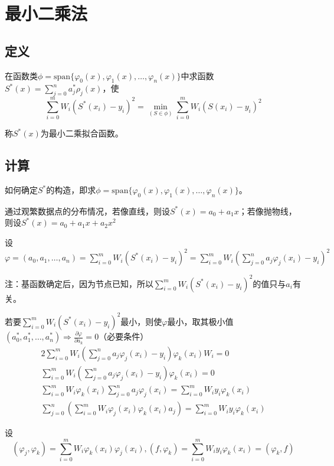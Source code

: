 \documentclass[UTF8,a4paper,11pt,oneside]{ctexbook}
\begin{document}
\chapter{最小二乘法}

\section{定义}

在函数类\(\phi=\mathrm{span}\{\varphi_0(x),\varphi_1(x),\ldots,\varphi_n(x)\}\)中求函数\(S^*(x)=\sum\limits_{j=0}^na_j^*\rho_j(x)\)，使
\[
\sum\limits_{i=0}^mW_i(S^*(x_i)-y_i)^2=\min\limits_{(S\in\phi)}\sum\limits_{i=0}^mW_i(S(x_i)-y_i)^2
\]

称\(S^*(x)\)为最小二乘拟合函数。

\section{计算}

如何确定\(S^*\)的构造，即求\(\phi=\mathrm{span}\{\varphi_0(x),\varphi_1(x),\ldots,\varphi_n(x)\}\)。

通过观繁数据点的分布情况，若像直线，则设\(S^*(x)=a_0+a_1x\)；若像抛物线，则设\(S^*(x)=a_0+a_1x+a_2x^2\)

设\(\varphi=(a_0,a_1,\ldots,a_n)=\sum\limits_{i=0}^{m}W_i(S^*(x_i)-y_i)^2=\sum\limits_{i=0}^mW_i(\sum\limits_{j=0}^na_j\varphi_j(x_i)-y_i)^2\)

注：基函数确定后，因为节点已知，所以\(\sum\limits_{i=0}^mW_i(S^*(x_i)-y_i)^2\)的值只与\(a_i\)有关。

若要\(\sum\limits_{i=0}^mW_i(S^*(x_i)-y_i)^2\)最小，则使\(\varphi\)最小，取其极小值\((a_0^*,a_1^*,\ldots,a_n^*)\Rightarrow\frac{\partial\varphi}{\partial a_k}=0\)（必要条件）
\begin{gather*}
    2\sum_{i=0}^mW_i\left(\sum_{j=0}^na_j\varphi_j(x_i)-y_i\right)\varphi_k(x_i)W_i=0\\
    \sum_{i=0}^mW_i\left(\sum_{j=0}^na_j\varphi_j(x_i)-y_i\right)\varphi_k(x_i)=0\\
    \sum_{i=0}^mW_i\varphi_k(x_i)\sum_{j=0}^na_j\varphi_j(x_i)=\sum_{i=0}^mW_iy_i\varphi_k(x_i)\\
    \sum_{j=0}^n\left(\sum_{i=0}^mW_i\varphi_j(x_i)\varphi_k(x_i)a_j\right)=\sum_{i=0}^mW_iy_i\varphi_k(x_i)
\end{gather*}

设
\[
(\varphi_j,\varphi_k)=\sum_{i=0}^mW_i\varphi_k(x_i)\varphi_j(x_i),(f,\varphi_k)=\sum_{i=0}^mW_iy_i\varphi_k(x_i)=(\varphi_k,f)
\]
\end{document}
